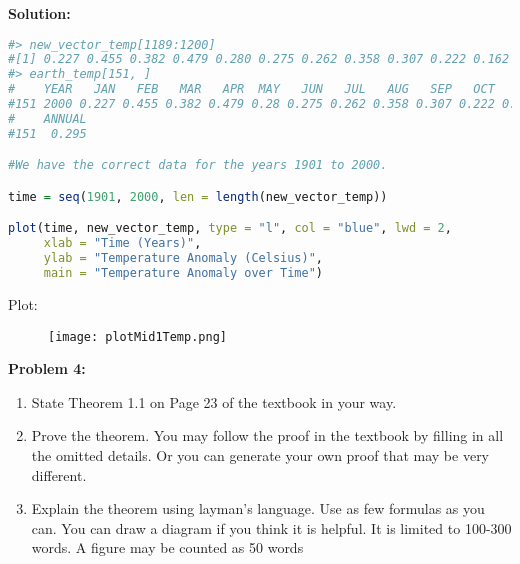 \documentclass[12pt]{article}
\newenvironment{problem}[1]{
    \textbf{Problem #1:}
}{
    \rmfamily \vspace{2em}
}
\newenvironment{solution}{
    \textbf{Solution:}
    
}{
    
    \vspace{2em}
}
\begin{document}
\begin{solution}
\begin{enumerate}[label=\alph*)]
\begin{lstlisting}[language=R]
#> new_vector_temp[1189:1200]
#[1] 0.227 0.455 0.382 0.479 0.280 0.275 0.262 0.358 0.307 0.222 0.162 0.151
#> earth_temp[151, ]
#    YEAR   JAN   FEB   MAR   APR  MAY   JUN   JUL   AUG   SEP   OCT   NOV   DEC
#151 2000 0.227 0.455 0.382 0.479 0.28 0.275 0.262 0.358 0.307 0.222 0.162 0.151
#    ANNUAL
#151  0.295

#We have the correct data for the years 1901 to 2000.

time = seq(1901, 2000, len = length(new_vector_temp))

plot(time, new_vector_temp, type = "l", col = "blue", lwd = 2,
     xlab = "Time (Years)",
     ylab = "Temperature Anomaly (Celsius)",
     main = "Temperature Anomaly over Time")
        \end{lstlisting}
        Plot:
        \begin{figure}[H]
            \centering
            \texttt{[image: plotMid1Temp.png]}
        \end{figure}
    \end{enumerate}
\end{solution}

\begin{problem}{4}
    \begin{enumerate}[label=\alph*)]
        \item State Theorem 1.1 on Page 23 of the textbook in your way.
        \item Prove the theorem. You may follow the proof in the textbook by filling in all the omitted details. Or you can generate your own proof that may be very different.
        \item Explain the theorem using layman’s language. Use as few formulas as you can. You can draw a diagram if you think it is helpful. It is limited to 100-300 words. A figure may be counted as 50 words
    \end{enumerate}
\end{problem}
\end{document}
